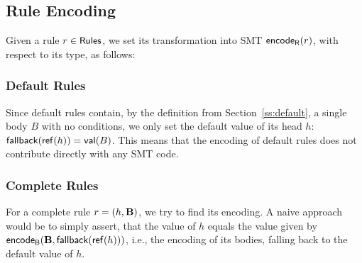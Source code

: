 %

\subsection{Rule Encoding}
\label{ss:rules:encode}

Given a rule $r \in \mathsf{Rules}$, we set its transformation into SMT $\mathsf{encode_{\tiny{R}}}(r)$, with respect to its type, as follows:

\subsubsection{Default Rules}
Since default rules contain, by the definition from Section~\ref{ss:default}, a single body $B$ with no conditions, we only set the default value of its head $h$: $\mathsf{fallback}(\mathsf{ref}(h)) = \mathsf{val}(B)$.
This means that the encoding of default rules does not contribute directly with any SMT code.

\subsubsection{Complete Rules}
For a complete rule $r = (h,\mathbf{B})$, we try to find its encoding.
A naive approach would be to simply assert, that the value of $h$ equals the value given by $\mathsf{encode_{\tiny{B}}}(\mathbf{B},\mathsf{fallback}(\mathsf{ref}(h)))$, i.e., the encoding of its bodies, falling back to the default value of $h$.

